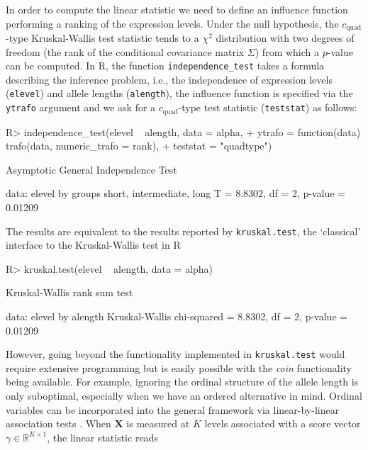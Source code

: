 \documentclass{article}
\newcommand{\Rpackage}[1]{\textit{#1}}
\newcommand{\Robject}[1]{\texttt{#1}}
\newcommand{\Rcmd}[1]{\texttt{#1}}
\newcommand{\RR}{\textsf{R}}
\newcommand{\R}{\mathbb{R} }
\newcommand{\X}{\mathbf{X}}
\newenvironment{Schunk}{}{}
\begin{document}
In order to compute the linear statistic we need to define an
influence function performing a ranking of the expression levels.
Under the null hypothesis, the $c_\text{quad}$-type Kruskal-Wallis 
test statistic tends to a $\chi^2$
distribution with two degrees of freedom (the rank of the conditional
covariance matrix $\Sigma$) from which a $p$-value can be
computed. In \RR{}, the function \Rcmd{independence\_test} takes a formula
describing the inference problem, i.e., the independence of expression
levels (\Robject{elevel}) and allele lengths (\Robject{alength}), the
influence function is specified via the \Rcmd{ytrafo} argument and we ask
for a $c_\text{quad}$-type test statistic (\Rcmd{teststat}) as follows:
\begin{Schunk}
\begin{Sinput}
R> independence_test(elevel ~ alength, data = alpha, 
+     ytrafo = function(data) trafo(data, numeric_trafo = rank), 
+     teststat = "quadtype")
\end{Sinput}
\begin{Soutput}
	Asymptotic General Independence Test

data:  elevel by groups short, intermediate, long 
T = 8.8302, df = 2, p-value = 0.01209
\end{Soutput}
\end{Schunk}
The results are equivalent to the results reported by \Rcmd{kruskal.test},
the `classical' interface to the Kruskal-Wallis test in \RR{}
\begin{Schunk}
\begin{Sinput}
R> kruskal.test(elevel ~ alength, data = alpha)
\end{Sinput}
\begin{Soutput}
	Kruskal-Wallis rank sum test

data:  elevel by alength 
Kruskal-Wallis chi-squared = 8.8302, df = 2, p-value = 0.01209
\end{Soutput}
\end{Schunk}
However, going beyond the functionality implemented in \Rcmd{kruskal.test}
would require extensive programming but is easily possible with the
\Rpackage{coin} functionality being available. For example, 
ignoring the ordinal structure of the allele length is only
suboptimal, especially when we have an ordered alternative in mind. 
Ordinal variables can be incorporated into the general framework
via linear-by-linear association tests \citep{Agresti2002}. 
When $\X$ is measured at $K$ levels associated with a score vector 
$\gamma \in \R^{K \times 1}$, the linear statistic reads
\end{document}
